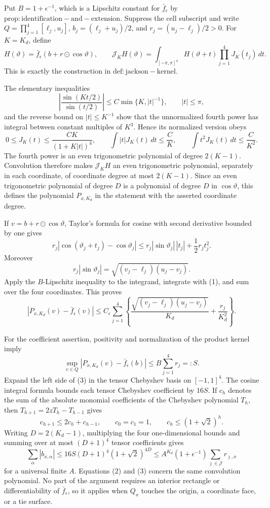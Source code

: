 Put \(B=1+\epsilon^{-1}\), which is a Lipschitz constant for \(\bar f_\epsilon\) by \(\mathrm{prop:identification-and-extension}\).  Suppress the cell subscript and write \(Q=\prod_{j=1}^4[\ell_j,u_j]\), \(b_j=(\ell_j+u_j)/2\), and \(r_j=(u_j-\ell_j)/2>0\).  For \(K=K_d\), define
\[
 H(\vartheta)=\bar f_\epsilon(b+r\odot\cos\vartheta),
 \qquad
 \mathcal J_KH(\vartheta)=\int_{[-\pi,\pi]^4}H(\vartheta+t)\prod_{j=1}^4J_K(t_j)\,dt.
\]
This is exactly the construction in \(\mathrm{def:jackson-kernel}\).

The elementary inequalities
\[
 \left|\frac{\sin(Kt/2)}{\sin(t/2)}\right|
 \leq C\min\{K,|t|^{-1}\},
 \qquad |t|\leq\pi,
\]
and the reverse bound on \(|t|\leq K^{-1}\) show that the unnormalized fourth power has integral between constant multiples of \(K^3\).  Hence its normalized version obeys
\[
 0\leq J_K(t)\leq\frac{CK}{(1+K|t|)^4},\qquad
 \int|t|J_K(t)\,dt\leq\frac CK,\qquad
 \int t^2J_K(t)\,dt\leq\frac C{K^2}.                                      \tag{1}
\]
The fourth power is an even trigonometric polynomial of degree \(2(K-1)\).  Convolution therefore makes \(\mathcal J_KH\) an even trigonometric polynomial, separately in each coordinate, of coordinate degree at most \(2(K-1)\).  Since an even trigonometric polynomial of degree \(D\) is a polynomial of degree \(D\) in \(\cos\vartheta\), this defines the polynomial \(P_{x,K_d}\) in the statement with the asserted coordinate degree.

If \(v=b+r\odot\cos\vartheta\), Taylor's formula for cosine with second derivative bounded by one gives
\[
 r_j|\cos(\vartheta_j+t_j)-\cos\vartheta_j|
 \leq r_j|\sin\vartheta_j|\,|t_j|+\frac12r_jt_j^2.
\]
Moreover
\[
 r_j|\sin\vartheta_j|=\sqrt{(v_j-\ell_j)(u_j-v_j)}.
\]
Apply the \(B\)-Lipschitz inequality to the integrand, integrate with (1), and sum over the four coordinates.  This proves
\[
 |P_{x,K_d}(v)-\bar f_\epsilon(v)|
 \leq C_\epsilon\sum_{j=1}^4\left\{
 \frac{\sqrt{(v_j-\ell_j)(u_j-v_j)}}{K_d}+\frac{r_j}{K_d^2}
 \right\}.                                                               \tag{2}
\]

For the coefficient assertion, positivity and normalization of the product kernel imply
\[
 \sup_{v\in Q}|P_{x,K_d}(v)-\bar f_\epsilon(b)|
 \leq B\sum_{j=1}^4r_j=:S.                                               \tag{3}
\]
Expand the left side of (3) in the tensor Chebyshev basis on \([-1,1]^4\).  The cosine integral formula bounds each tensor Chebyshev coefficient by \(16S\).  If \(c_h\) denotes the sum of the absolute monomial coefficients of the Chebyshev polynomial \(T_h\), then \(T_{h+1}=2zT_h-T_{h-1}\) gives
\[
 c_{h+1}\leq2c_h+c_{h-1},\qquad c_0=c_1=1,\qquad
 c_h\leq(1+\sqrt2)^h.
\]
Writing \(D=2(K_d-1)\), multiplying the four one-dimensional bounds and summing over at most \((D+1)^4\) tensor coefficients gives
\[
 \sum_\alpha|b_{x,\alpha}|
 \leq16S(D+1)^4(1+\sqrt2)^{4D}
 \leq A^{K_d}(1+\epsilon^{-1})\sum_{\jmath\in\mathcal J}r_{\jmath,x}
\]
for a universal finite \(A\).  Equations (2) and (3) concern the same convolution polynomial.  No part of the argument requires an interior rectangle or differentiability of \(\bar f_\epsilon\), so it applies when \(Q_x\) touches the origin, a coordinate face, or a tie surface.